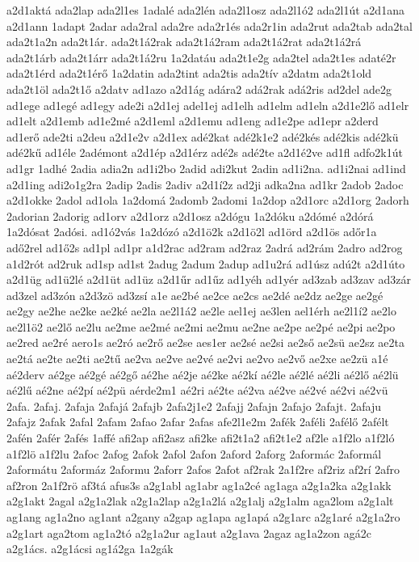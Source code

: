 {a2d1aktá
ada2lap
ada2l1es
1adalé
ada2lén
ada2l1osz
ada2l1ó2
ada2l1út
a2d1ana
a2d1ann
1adapt
2adar
ada2ral
ada2re
ada2r1és
ada2r1in
ada2rut
ada2tab
ada2tal
ada2t1a2n
ada2t1ár.
ada2t1á2rak
ada2t1á2ram
ada2t1á2rat
ada2t1á2rá
ada2t1árb
ada2t1árr
ada2t1á2ru
1a2datáu
ada2t1e2g
ada2tel
ada2t1es
adaté2r
ada2t1érd
ada2t1érő
1a2datin
ada2tint
ada2tis
ada2tív
a2datm
ada2t1old
ada2t1öl
ada2t1ő
a2datv
ad1azo
a2d1ág
adára2
adá2rak
adá2ris
ad2del
ade2g
ad1ege
ad1egé
ad1egy
ade2i
a2d1ej
adel1ej
ad1elh
ad1elm
ad1eln
a2d1e2lő
ad1elr
ad1elt
a2d1emb
ad1e2mé
a2d1eml
a2d1emu
ad1eng
ad1e2pe
ad1epr
a2derd
ad1erő
ade2ti
a2deu
a2d1e2v
a2d1ex
adé2kat
adé2k1e2
adé2kés
adé2kis
adé2kü
adé2kű
ad1éle
2adémont
a2d1ép
a2d1érz
adé2s
adé2te
a2d1é2ve
ad1fl
adfo2k1út
ad1gr
1adhé
2adia
adia2n
ad1i2bo
2adid
adi2kut
2adin
ad1i2na.
ad1i2nai
ad1ind
a2d1ing
adi2o1g2ra
2adip
2adis
2adiv
a2d1í2z
ad2ji
adka2na
ad1kr
2adob
2adoc
a2d1okke
2adol
ad1ola
1a2domá
2adomb
2adomi
1a2dop
a2d1orc
a2d1org
2adorh
2adorian
2adorig
ad1orv
a2d1orz
a2d1osz
a2dógu
1a2dóku
a2dómé
a2dórá
1a2dósat
2adósi.
ad1ó2vás
1a2dózó
a2d1ö2k
a2d1ö2l
ad1örd
a2d1ös
adőr1a
adő2rel
ad1ő2s
ad1pl
ad1pr
a1d2rac
ad2ram
ad2raz
2adrá
ad2rám
2adro
ad2rog
a1d2rót
ad2ruk
ad1sp
ad1st
2adug
2adum
2adup
ad1u2rá
ad1úsz
adú2t
a2d1úto
a2d1üg
ad1ü2lé
a2d1üt
ad1üz
a2d1űr
ad1űz
ad1yéh
ad1yér
ad3zab
ad3zav
ad3zár
ad3zel
ad3zón
a2d3zö
ad3zsí
a1e
ae2bé
ae2ce
ae2cs
ae2dé
ae2dz
ae2ge
ae2gé
ae2gy
ae2he
ae2ke
ae2ké
ae2la
ae2l1á2
ae2le
ael1ej
ae3len
ael1érh
ae2l1í2
ae2lo
ae2l1ö2
ae2lő
ae2lu
ae2me
ae2mé
ae2mi
ae2mu
ae2ne
ae2pe
ae2pé
ae2pi
ae2po
ae2red
ae2ré
aero1s
ae2ró
ae2rő
ae2se
aes1er
ae2sé
ae2si
ae2ső
ae2sü
ae2sz
ae2ta
ae2tá
ae2te
ae2ti
ae2tű
ae2va
ae2ve
ae2vé
ae2vi
ae2vo
ae2vő
ae2xe
ae2zü
a1é
aé2derv
aé2ge
aé2gé
aé2gő
aé2he
aé2je
aé2ke
aé2kí
aé2le
aé2lé
aé2li
aé2lő
aé2lü
aé2lű
aé2ne
aé2pí
aé2pü
aérde2m1
aé2ri
aé2te
aé2va
aé2ve
aé2vé
aé2vi
aé2vü
2afa.
2afaj.
2afaja
2afajá
2afajb
2afa2j1e2
2afajj
2afajn
2afajo
2afajt.
2afaju
2afajz
2afak
2afal
2afam
2afao
2afar
2afas
afe2l1e2m
2afék
2aféli
2afélő
2afélt
2afén
2afér
2afés
1affé
afi2ap
afi2asz
afi2ke
afi2t1a2
afi2t1e2
af2le
a1f2lo
a1f2ló
a1f2lö
a1f2lu
2afoc
2afog
2afok
2afol
2afon
2aford
2aforg
2aformác
2aformál
2aformátu
2aformáz
2aformu
2aforr
2afos
2afot
af2rak
2a1f2re
af2riz
af2rí
2afro
af2ron
2a1f2rö
af3tá
afus3s
a2g1abl
ag1abr
ag1a2cé
ag1aga
a2g1a2ka
a2g1akk
a2g1akt
2agal
a2g1a2lak
a2g1a2lap
a2g1a2lá
a2g1alj
a2g1alm
aga2lom
a2g1alt
ag1ang
ag1a2no
ag1ant
a2gany
a2gap
ag1apa
ag1apá
a2g1arc
a2g1aré
a2g1a2ro
a2g1art
aga2tom
ag1a2tó
a2g1a2ur
ag1aut
a2g1ava
2agaz
ag1a2zon
agá2c
a2g1ács.
a2g1ácsi
ag1á2ga
1a2gák
}
